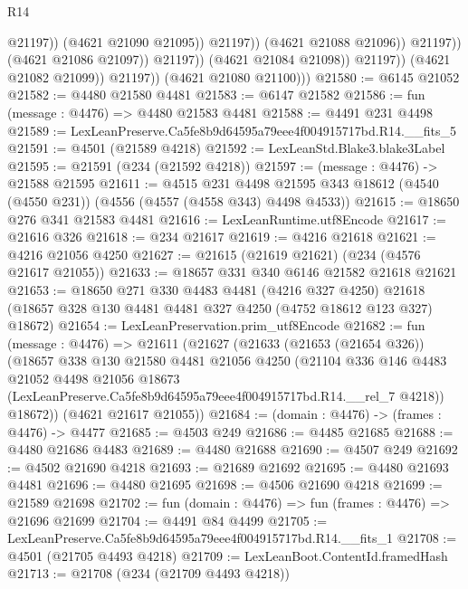 \begin{lexlean}{R14}
\begin{coremodule}
                                          @21197))
                                      (@4621 @21090 @21095))
                                    @21197))
                                (@4621 @21088 @21096))
                              @21197))
                          (@4621 @21086 @21097))
                        @21197))
                    (@4621 @21084 @21098))
                  @21197))
              (@4621 @21082 @21099))
            @21197))
        (@4621 @21080 @21100)))
@21580 := @6145 @21052
@21582 := @4480 @21580 @4481
@21583 := @6147 @21582
@21586 := fun (message : @4476) => @4480 @21583 @4481
@21588 := @4491 @231 @4498
@21589 := LexLeanPreserve.Ca5fe8b9d64595a79eee4f004915717bd.R14.__fits_5
@21591 := @4501 (@21589 @4218)
@21592 := LexLeanStd.Blake3.blake3Label
@21595 := @21591 (@234 (@21592 @4218))
@21597 := (message : @4476) -> @21588 @21595
@21611 := @4515
    @231
    @4498
    @21595
    @343
    @18612
    (@4540 (@4550 @231))
    (@4556 (@4557 (@4558 @343) @4498 @4533))
@21615 := @18650 @276 @341 @21583 @4481
@21616 := LexLeanRuntime.utf8Encode
@21617 := @21616 @326
@21618 := @234 @21617
@21619 := @4216 @21618
@21621 := @4216 @21056 @4250
@21627 := @21615 (@21619 @21621) (@234 (@4576 @21617 @21055))
@21633 := @18657 @331 @340 @6146 @21582 @21618 @21621
@21653 := @18650
    @271
    @330
    @4483
    @4481
    (@4216 @327 @4250)
    @21618
    (@18657 @328 @130 @4481 @4481 @327 @4250 (@4752 @18612 @123 @327) @18672)
@21654 := LexLeanPreservation.prim_utf8Encode
@21682 := fun (message : @4476) =>
  @21611
    (@21627
      (@21633
        (@21653 (@21654 @326))
        (@18657
          @338
          @130
          @21580
          @4481
          @21056
          @4250
          (@21104
            @336
            @146
            @4483
            @21052
            @4498
            @21056
            @18673
            (LexLeanPreserve.Ca5fe8b9d64595a79eee4f004915717bd.R14.__rel_7 @4218))
          @18672))
      (@4621 @21617 @21055))
@21684 := (domain : @4476) -> (frames : @4476) -> @4477
@21685 := @4503 @249
@21686 := @4485 @21685
@21688 := @4480 @21686 @4483
@21689 := @4480 @21688
@21690 := @4507 @249
@21692 := @4502 @21690 @4218
@21693 := @21689 @21692
@21695 := @4480 @21693 @4481
@21696 := @4480 @21695
@21698 := @4506 @21690 @4218
@21699 := @21589 @21698
@21702 := fun (domain : @4476) => fun (frames : @4476) => @21696 @21699
@21704 := @4491 @84 @4499
@21705 := LexLeanPreserve.Ca5fe8b9d64595a79eee4f004915717bd.R14.__fits_1
@21708 := @4501 (@21705 @4493 @4218)
@21709 := LexLeanBoot.ContentId.framedHash
@21713 := @21708 (@234 (@21709 @4493 @4218))

\end{coremodule}
\end{lexlean}
